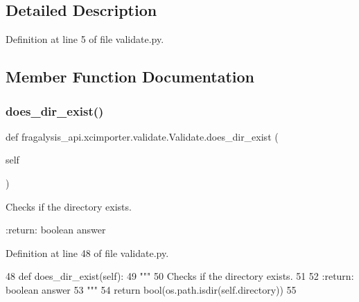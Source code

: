\subsection{Detailed Description}


Definition at line 5 of file validate.\+py.



\subsection{Member Function Documentation}
\mbox{\label{classfragalysis__api_1_1xcimporter_1_1validate_1_1_validate_a885f473957a347300395920895108c64}} 
\subsubsection{\texorpdfstring{does\+\_\+dir\+\_\+exist()}{does\_dir\_exist()}}
{\footnotesize\ttfamily def fragalysis\+\_\+api.\+xcimporter.\+validate.\+Validate.\+does\+\_\+dir\+\_\+exist (\begin{DoxyParamCaption}\item[{}]{self }\end{DoxyParamCaption})}

\begin{DoxyVerb}Checks if the directory exists.

:return: boolean answer
\end{DoxyVerb}
 

Definition at line 48 of file validate.\+py.


\begin{DoxyCode}
48     \textcolor{keyword}{def }does\_dir\_exist(self):
49         \textcolor{stringliteral}{"""}
50 \textcolor{stringliteral}{        Checks if the directory exists.}
51 \textcolor{stringliteral}{}
52 \textcolor{stringliteral}{        :return: boolean answer}
53 \textcolor{stringliteral}{        """}
54         \textcolor{keywordflow}{return} bool(os.path.isdir(self.directory))
55 
\end{DoxyCode}
\mbox{\label{classfragalysis__api_1_1xcimporter_1_1validate_1_1_validate_a0b6c43c8e26bc7b2bc5f2caf982f0a5e}} 
